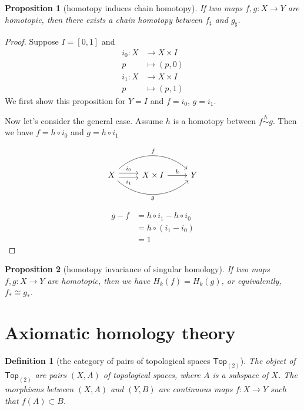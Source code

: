 \documentclass{report}
\newtheorem{definition}{Definition}[section]
\newtheorem{proposition}{Proposition}[section]
\theoremstyle{nonumberplain}
\newtheorem{proof}{Proof.}
\begin{document}
\begin{proposition}[homotopy induces chain homotopy]
	If two maps $f,g :X\to Y$ are homotopic, then there exists a chain homotopy between $f_\sharp$ and $g_\sharp$.
\end{proposition}
\begin{proof}
	Suppose $I=[0,1]$ and
	\begin{align*}
		i_0: X &\longrightarrow X\times I\\
		p&\longmapsto (p,0)
	\end{align*}
	\begin{align*}
		i_1: X &\longrightarrow X\times I\\
		p&\longmapsto (p,1)
	\end{align*}
	We first show this proposition for $Y=I$ and $f=i_0$, $g=i_1$. 
	
	
	Now let's consider the general case. Assume $h$ is a homotopy between $f\overset{h}{\sim} g$. Then we have $f=h\circ i_0$ and $g=h\circ i_1$
	
	\begin{equation*}
		\begin{tikzcd}		
			X \arrow[r, shift left=1.2, "i_0"]\arrow[r,shift right=1.2,"i_1"']  \arrow[rr, bend left=42, "f"{ above}] \arrow[rr, bend right=42, "g"{below}]
			& X\times I \arrow[r, "h"] & Y
		\end{tikzcd}			
	\end{equation*}

	\begin{align*}
		g-f &= h\circ i_1 - h\circ i_0\\
		&= h\circ (i_1-i_0)\\
		&= 1
	\end{align*}
\end{proof}

\begin{proposition}[homotopy invariance of singular homology]
	If two maps $f,g :X\to Y$ are homotopic, then we have $H_k(f)=H_k(g)$, or equivalently, $f_*\cong g_*$.
\end{proposition}

\section{Axiomatic homology theory}
\begin{definition}[the category of pairs of topological spaces $\mathsf{Top}_{(2)}$]
	The object of $\mathsf{Top}_{(2)}$ are pairs $(X, A)$ of topological spaces, where $A$ is a subspace of $X$. The morphisms between $(X, A)$ and $(Y, B)$ are continuous maps $f:X\to Y$ such that $f(A)\subset B$.
\end{definition}
\end{document}
